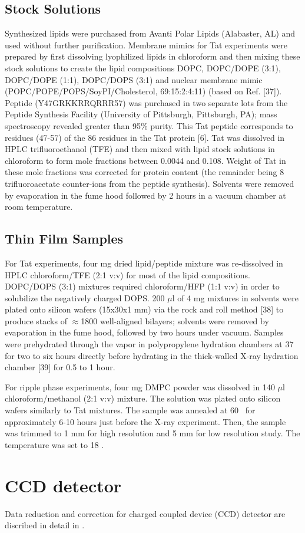 \subsection{Stock Solutions}
Synthesized lipids were purchased from Avanti Polar Lipids (Alabaster, AL) and 
used without further purification. Membrane mimics for Tat experiments 
were prepared by first 
dissolving lyophilized lipids in chloroform and then mixing these stock 
solutions to create the lipid compositions
DOPC, DOPC/DOPE (3:1), DOPC/DOPE (1:1), DOPC/DOPS (3:1) and nuclear membrane
mimic (POPC/POPE/POPS/SoyPI/Cholesterol, 69:15:2:4:11) (based on Ref. [37]). 
Peptide
(Y47GRKKRRQRRR57) was purchased in two separate lots from the Peptide Synthesis 
Facility
(University of Pittsburgh, Pittsburgh, PA); mass spectroscopy revealed greater
than 95\% 
purity. This Tat
peptide corresponds to residues (47-57) of the 86 residues in the Tat 
protein [6]. Tat was
dissolved in HPLC trifluoroethanol (TFE) and then mixed with lipid stock 
solutions in
chloroform to form mole fractions between 0.0044 and 0.108. Weight of Tat in 
these mole
fractions was corrected for protein content (the remainder being 8 
trifluoroacetate counter-ions
from the peptide synthesis). Solvents were removed by evaporation in the fume 
hood followed
by 2 hours in a vacuum chamber at room temperature.

\subsection{Thin Film Samples}

For Tat experiments, four mg dried lipid/peptide mixture was re-dissolved in HPLC chloroform/TFE 
(2:1 v:v)
for most of the lipid compositions. 
DOPC/DOPS (3:1) mixtures required
chloroform/HFP (1:1 v:v) in order to solubilize the negatively charged DOPS. 
200 $\mu$l of 4 mg
mixtures in solvents were plated onto silicon wafers (15x30x1 mm) via the rock 
and roll method
[38] to produce stacks of $\approx$1800 well-aligned bilayers; 
solvents were removed by 
evaporation in
the fume hood, followed by two hours under vacuum. Samples were prehydrated 
through the
vapor in polypropylene hydration chambers at 37 \degC for two to six hours 
directly before hydrating in the
thick-walled X-ray hydration chamber [39] for 0.5 to 1 hour. 

For ripple phase experiments, four mg DMPC powder was dissolved in 
140 $\mu$l chloroform/methanol (2:1 v:v) mixture. The solution was
plated onto silicon wafers similarly to Tat mixtures. 
The sample was annealed at 60 \textcelsius\ for approximately
6-10 hours just before the X-ray experiment. 
Then, the sample was trimmed to 1 mm for high
resolution and 5 mm for low resolution study. The temperature
was set to 18 \textcelsius. 

\section{CCD detector}
Data reduction and correction for charged coupled device (CCD) detector
are discribed in detail in \cite{ref:Burner}.
